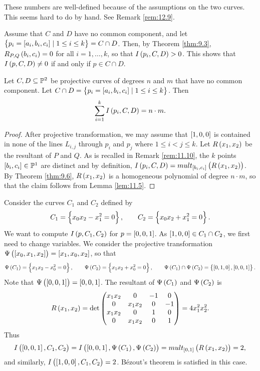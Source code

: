 \begin{note*}
These numbers are well-defined because of the assumptions on the two curves. This seems hard to do by hand. See Remark \ref{rem:12.9}.
\end{note*}

\begin{remark}
\label{rem:11.10}
Assume that $ C $ and $ D $ have no common component, and let $ \cbr{p_i = \sbr{a_i, b_i, c_i} \mid 1 \le i \le k} = C \cap D $. Then, by Theorem \ref{thm:9.3}, $ R_{P, Q}\br{b_i, c_i} = 0 $ for all $ i = 1, \dots, k $, so that $ I\br{p_i, C, D} > 0 $. This shows that $ I\br{p, C, D} \ne 0 $ if and only if $ p \in C \cap D $.
\end{remark}

\begin{theorem}
\label{thm:11.11}
Let $ C, D \subseteq \P^2 $ be projective curves of degrees $ n $ and $ m $ that have no common component. Let $ C \cap D = \cbr{p_i = \sbr{a_i, b_i, c_i} \mid 1 \le i \le k} $. Then
$$ \sum_{i = 1}^k I\br{p_i, C, D} = n \cdot m. $$
\end{theorem}

\begin{proof}
After projective transformation, we may assume that $ \sbr{1, 0, 0} $ is contained in none of the lines $ L_{i, j} $ through $ p_i $ and $ p_j $ where $ 1 \le i < j \le k $. Let $ R\br{x_1, x_2} $ be the resultant of $ P $ and $ Q $. As is recalled in Remark \ref{rem:11.10}, the $ k $ points $ \sbr{b_i, c_i} \in \P^1 $ are distinct and by definition, $ I\br{p_i, C, D} = mult_{\sbr{b_i, c_i}}\br{R\br{x_1, x_2}} $. By Theorem \ref{thm:9.6}, $ R\br{x_1, x_2} $ is a homogeneous polynomial of degree $ n \cdot m $, so that the claim follows from Lemma \ref{lem:11.5}.
\end{proof}


\begin{example}
Consider the curves $ C_1 $ and $ C_2 $ defined by
$$ C_1 = \cbr{x_0x_2 - x_1^2 = 0}, \qquad C_2 = \cbr{x_0x_2 + x_1^2 = 0}. $$
We want to compute $ I\br{p, C_1, C_2} $ for $ p = \sbr{0, 0, 1} $. As $ \sbr{1, 0, 0} \in C_1 \cap C_2 $, we first need to change variables. We consider the projective transformation $ \Psi\br{\sbr{x_0, x_1, x_2}} = \sbr{x_1, x_0, x_2} $, so that
$$ \Psi\br{C_1} = \cbr{x_1x_2 - x_0^2 = 0}, \qquad \Psi\br{C_2} = \cbr{x_1x_2 + x_0^2 = 0}, \qquad \Psi\br{C_1} \cap \Psi\br{C_2} = \cbr{\sbr{0, 1, 0}, \sbr{0, 0, 1}}. $$
Note that $ \Psi\br{\sbr{0, 0, 1}} = \sbr{0, 0, 1} $. The resultant of $ \Psi\br{C_1} $ and $ \Psi\br{C_2} $ is
$$ R\br{x_1, x_2} = \det
\begin{pmatrix}
x_1x_2 & 0 & -1 & 0 \\
0 & x_1x_2 & 0 & -1 \\
x_1x_2 & 0 & 1 & 0 \\
0 & x_1x_2 & 0 & 1
\end{pmatrix}
= 4x_1^2x_2^2. $$
Thus
$$ I\br{\sbr{0, 0, 1}, C_1, C_2} = I\br{\sbr{0, 0, 1}, \Psi\br{C_1}, \Psi\br{C_2}} = mult_{\sbr{0, 1}}\br{R\br{x_1, x_2}} = 2, $$
and similarly, $ I\br{\sbr{1, 0, 0}, C_1, C_2} = 2 $. B\'ezout's theorem is satisfied in this case.
\end{example}

